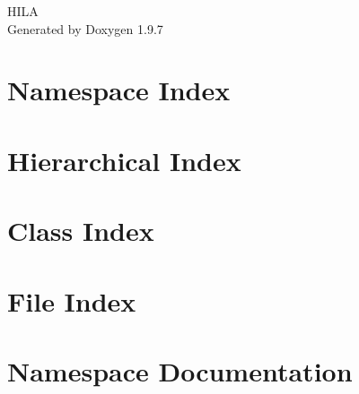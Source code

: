 \documentclass[twoside]{book}
\newcommand{\+}{\discretionary{\mbox{\scriptsize$\hookleftarrow$}}{}{}}
\newcommand{\clearemptydoublepage}{%
    \newpage{\pagestyle{empty}\cleardoublepage}%
  }
\begin{document}
  \raggedbottom
    \hypersetup{pageanchor=false,
                bookmarksnumbered=true,
                pdfencoding=unicode
               }
  \begin{titlepage}
  \vspace*{7cm}
  \begin{center}%
  {\Large HILA}\\
  \vspace*{1cm}
  {\large Generated by Doxygen 1.9.7}\\
  \end{center}
  \end{titlepage}
  \clearemptydoublepage
  \tableofcontents
  \clearemptydoublepage
  \hypersetup{pageanchor=true}






\chapter{Namespace Index}

\chapter{Hierarchical Index}

\chapter{Class Index}

\chapter{File Index}

\chapter{Namespace Documentation}


\end{document}
